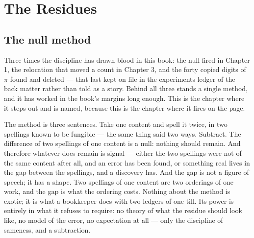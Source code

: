 \chapter{The Residues}

\section{The null method}

Three times the discipline has drawn blood in this book: the null fired in Chapter
1, the relocation that moved a count in Chapter 3, and the forty copied digits of
$\pi$ found and deleted --- that last kept on file in the experiments ledger of the
back matter rather than told as a story. Behind all three stands a single method, and it
has worked in the book's margins long enough. This is the chapter where it steps out
and is named, because this is the chapter where it fires on the page.

The method is three sentences. Take one content and spell it twice, in two spellings
known to be fungible --- the same thing said two ways. Subtract. The difference of
two spellings of one content is a null: nothing should remain. And therefore
whatever does remain is signal --- either the two spellings were not of the same
content after all, and an error has been found, or something real lives in the gap
between the spellings, and a discovery has. And the gap is not a figure of speech;
it has a shape. Two spellings of one content are two orderings of one work, and the
gap is what the ordering costs. Nothing about the method is exotic; it
is what a bookkeeper does with two ledgers of one till. Its power is entirely in
what it refuses to require: no theory of what the residue should look like, no model
of the error, no expectation at all --- only the discipline of sameness, and a
subtraction.

